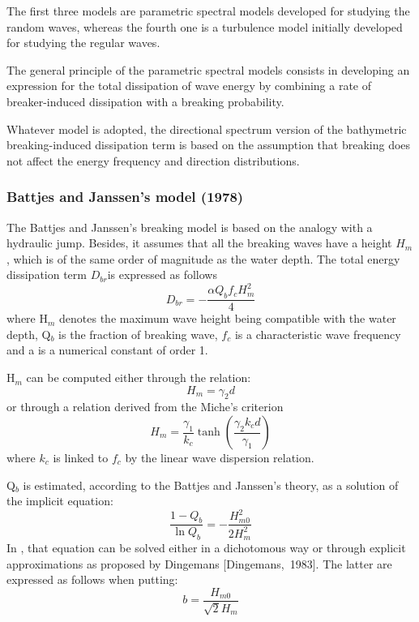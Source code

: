 The first three models are parametric spectral models developed for studying the random waves, whereas the fourth one is a turbulence model initially developed for studying the regular waves.

 The general principle of the parametric spectral models consists in developing an expression for the total dissipation of wave energy by combining a rate of breaker-induced dissipation with a breaking probability.

 Whatever model is adopted, the directional spectrum version of the bathymetric breaking-induced dissipation term is based on the assumption that breaking does not affect the energy frequency and direction distributions.


\subsubsection{Battjes and Janssen's model (1978)}
\label{parag4.3.5.1}
 The Battjes and Janssen's breaking model \cite{Battjes1978} is based on the analogy with a hydraulic jump. Besides, it assumes that all the breaking waves have a height $H_{m} $, which is of the same order of magnitude as the water depth. The total energy dissipation term $D_{br} $is expressed as follows
\begin{equation} \label{GrindEQ__4_44_}
D_{br} =-\frac{\alpha Q_{b} f_{c} H_{m}^{2} }{4}
\end{equation}
where H${}_{m}$ denotes the maximum wave height being compatible with the water depth, Q${}_{b}$ is the fraction of breaking wave, $f_{c} $ is a characteristic wave frequency and a is a numerical constant of order 1.

 H${}_{m}$ can be computed either through the relation:
\begin{equation} \label{GrindEQ__4_45_}
H_{m} =\gamma _{2} d
\end{equation}
or through a relation derived from the Miche's criterion
\begin{equation} \label{GrindEQ__4_46_}
H_{m} =\frac{\gamma _{1} }{k_{c} } \tanh \left(\frac{\gamma _{2} k_{c} d}{\gamma _{1} } \right)
\end{equation}
where $k_{c} $ is linked to $f_{c} $ by the linear wave dispersion relation.

 Q${}_{b}$ is estimated, according to the Battjes and Janssen's theory, as a solution of the implicit equation:
\begin{equation} \label{GrindEQ__4_47_}
\frac{1-Q_{b} }{\ln Q_{b} } =-\frac{H_{m0}^{2} }{2H_{m}^{2} }
\end{equation}
In \tomawac, that equation can be solved either in a dichotomous way or through explicit approximations as proposed by Dingemans [Dingemans,~1983]. The latter are expressed as follows when putting:
\[b=\frac{H_{m0} }{\sqrt{2} H_{m} } \]

